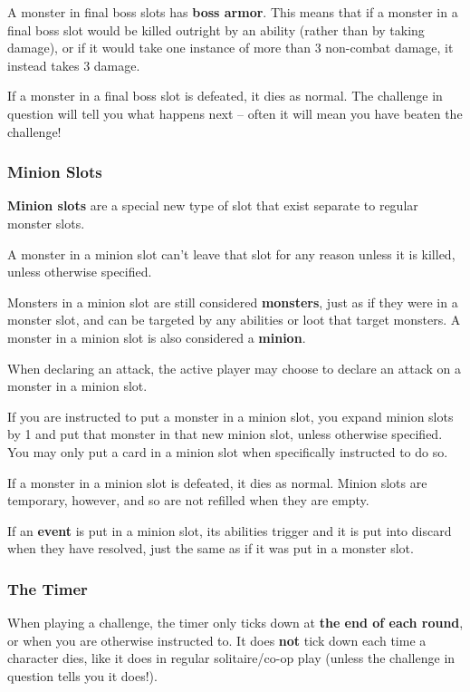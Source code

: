 \documentclass[10pt, a4paper, twoside]{article} %
\begin{document}
    A monster in final boss slots has \textbf{boss armor}. This means that if a monster in a final boss slot would be killed outright by an ability (rather than by taking damage), or if it would take one instance of more than 3 non-combat damage, it instead takes 3 damage.

    If a monster in a final boss slot is defeated, it dies as normal. The challenge in question will tell you what happens next – often it will mean you have beaten the challenge!

    \subsubsection*{Minion Slots}
    \textbf{Minion slots} are a special new type of slot that exist separate to regular monster slots.

    A monster in a minion slot can’t leave that slot for any reason unless it is killed, unless otherwise specified.

    Monsters in a minion slot are still considered \textbf{monsters}, just as if they were in a monster slot, and can be targeted by any abilities or loot that target monsters. A monster in a minion slot is also considered a \textbf{minion}.

    When declaring an attack, the active player may choose to declare an attack on a monster in a minion slot.

    If you are instructed to put a monster in a minion slot, you expand minion slots by 1 and put that monster in that new minion slot, unless otherwise specified. You may only put a card in a minion slot when specifically instructed to do so.

    If a monster in a minion slot is defeated, it dies as normal. Minion slots are temporary, however, and so are not refilled when they are empty.

    If an \textbf{event} is put in a minion slot, its abilities trigger and it is put into discard when they have resolved, just the same as if it was put in a monster slot.

    \subsubsection*{The Timer}
    When playing a challenge, the timer only ticks down at \textbf{the end of each round}, or when you are otherwise instructed to. It does \textbf{not} tick down each time a character dies, like it does in regular solitaire/co-op play (unless the challenge in question tells you it does!).
\end{document}
